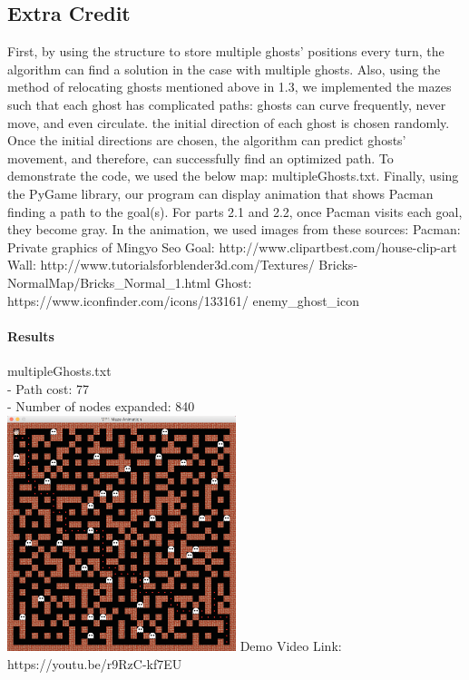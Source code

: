 \begin{multicols*}{2}
\subsection*{Extra Credit}
First, by using the structure to store multiple ghosts' positions every turn, the algorithm can find a solution in the case with multiple ghosts. Also, using the method of relocating ghosts mentioned above in 1.3, we implemented the mazes such that each ghost has complicated paths: ghosts can curve frequently, never move, and even circulate. the initial direction of each ghost is chosen randomly. Once the initial directions are chosen, the algorithm can predict ghosts' movement, and therefore, can successfully find an optimized path. To demonstrate the code, we used the below map: multipleGhosts.txt. Finally, using the PyGame library, our program can display animation that shows Pacman finding a path to the goal(s). For parts 2.1 and 2.2, once Pacman visits each goal, they become gray. In the animation, we used images from these sources:\newline
Pacman: Private graphics of Mingyo Seo\newline
Goal: http://www.clipartbest.com/house-clip-art\newline
Wall: http://www.tutorialsforblender3d.com/Textures/ \newline Bricks-NormalMap/Bricks\_Normal\_1.html \newline
Ghost: https://www.iconfinder.com/icons/133161/ \newline enemy\_ghost\_icon \newline


\paragraph{Results}
multipleGhosts.txt\\
- Path cost: 77\\
- Number of nodes expanded: 840\\
\includegraphics[width=0.5\textwidth]{graphics/multipleGhosts.png}
Demo Video Link: https://youtu.be/r9RzC-kf7EU

\end{multicols*}

